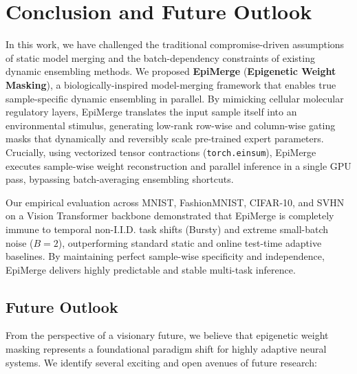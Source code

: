 \section{Conclusion and Future Outlook}
\label{sec:conclusion}

In this work, we have challenged the traditional compromise-driven assumptions of static model merging and the batch-dependency constraints of existing dynamic ensembling methods.
We proposed \textbf{EpiMerge} (\textbf{Epigenetic Weight Masking}), a biologically-inspired model-merging framework that enables true sample-specific dynamic ensembling in parallel.
By mimicking cellular molecular regulatory layers, EpiMerge translates the input sample itself into an environmental stimulus, generating low-rank row-wise and column-wise gating masks that dynamically and reversibly scale pre-trained expert parameters.
Crucially, using vectorized tensor contractions (\texttt{torch.einsum}), EpiMerge executes sample-wise weight reconstruction and parallel inference in a single GPU pass, bypassing batch-averaging ensembling shortcuts.

Our empirical evaluation across MNIST, FashionMNIST, CIFAR-10, and SVHN on a Vision Transformer backbone demonstrated that EpiMerge is completely immune to temporal non-I.I.D. task shifts (Bursty) and extreme small-batch noise ($B=2$), outperforming standard static and online test-time adaptive baselines.
By maintaining perfect sample-wise specificity and independence, EpiMerge delivers highly predictable and stable multi-task inference.

\subsection{Future Outlook}
From the perspective of a visionary future, we believe that epigenetic weight masking represents a foundational paradigm shift for highly adaptive neural systems. We identify several exciting and open avenues of future research:

